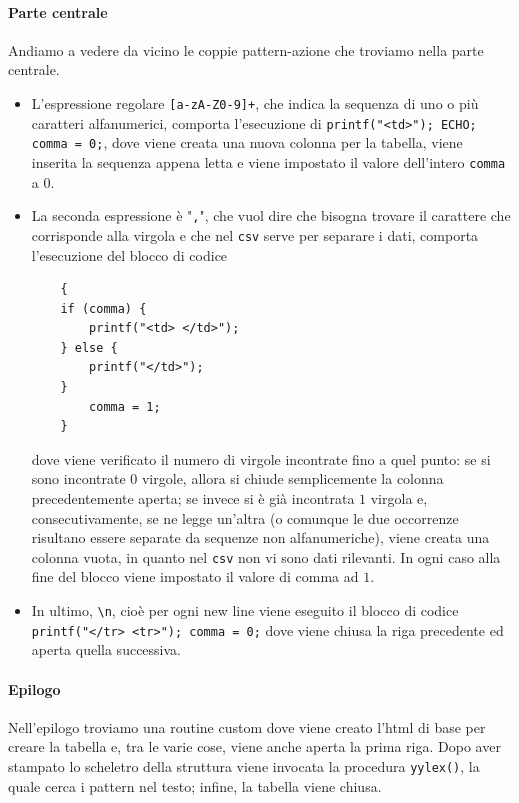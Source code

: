 \documentclass[class=book, crop=false, oneside, 12pt]{standalone}
\begin{document}
\paragraph{Parte centrale}
Andiamo a vedere da vicino le coppie pattern-azione che troviamo nella parte centrale.
\begin{itemize}
    \item L'espressione regolare \texttt{[a-zA-Z0-9]+}, che indica la sequenza di uno o più caratteri alfanumerici, comporta l'esecuzione di \texttt{printf("<td>"); ECHO; comma = 0;}, dove viene creata una nuova colonna per la tabella, viene inserita la sequenza appena letta e viene impostato il valore dell'intero \texttt{comma} a \(0\).
    \item La seconda espressione è "\texttt{,}", che vuol dire che bisogna trovare il carattere che corrisponde alla virgola e che nel \texttt{csv} serve per separare i dati, comporta l'esecuzione del blocco di codice
    \begin{verbatim}
    {            
    if (comma) {
        printf("<td> </td>"); 
    } else { 
        printf("</td>");
    }       
        comma = 1;
    }
    \end{verbatim}
        
    dove viene verificato il numero di virgole incontrate fino a quel punto: se si sono incontrate 0 virgole, allora si chiude semplicemente la colonna precedentemente aperta; se invece si è già incontrata \(1\) virgola e, consecutivamente, se ne legge un'altra (o comunque le due occorrenze risultano essere separate da sequenze non alfanumeriche), viene creata una colonna vuota, in quanto nel \texttt{csv} non vi sono dati rilevanti. In ogni caso alla fine del blocco viene impostato il valore di comma ad \(1\).
    \item In ultimo, \texttt{\textbackslash n}, cioè per ogni new line viene eseguito il blocco di codice \texttt{{printf("</tr> \n <tr>"); comma = 0;}} dove viene chiusa la riga precedente ed aperta quella successiva.
\end{itemize}

\paragraph{Epilogo}
Nell'epilogo troviamo una routine custom dove viene creato l'html di base per creare la tabella e, tra le varie cose, viene anche aperta la prima riga. Dopo aver stampato lo scheletro della struttura viene invocata la procedura \texttt{yylex()}, la quale cerca i pattern nel testo; infine, la tabella viene chiusa.
\end{document}
